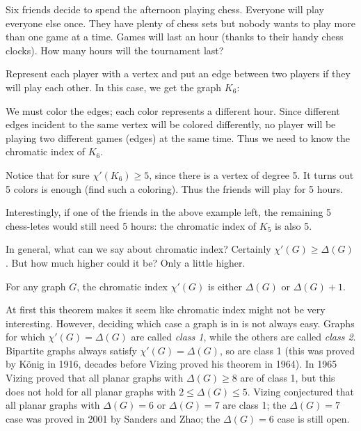 \documentclass[12pt]{article}
\begin{document}
\begin{example}
Six friends decide to spend the afternoon playing chess.  Everyone will play everyone else once.  They have plenty of chess sets but nobody wants to play more than one game at a time.  Games will last an hour (thanks to their handy chess clocks).  How many hours will the tournament last?

\begin{solution}
Represent each player with a vertex and put an edge between two players if they will play each other.  In this case, we get the graph $K_6$:

\begin{center}
\end{center}

We must color the edges; each color represents a different hour.  Since different edges incident to the same vertex will be colored differently, no player will be playing two different games (edges) at the same time.  Thus we need to know the chromatic index of $K_6$.

Notice that for sure $\chi'(K_6) \ge 5$, since there is a vertex of degree 5. It turns out 5 colors is enough (find such a coloring).  Thus the friends will play for 5 hours.
\end{solution}
\end{example}

Interestingly, if one of the friends in the above example left, the remaining 5 chess-letes would still need 5 hours: the chromatic index of $K_5$ is also 5.

In general, what can we say about chromatic index?  Certainly $\chi'(G) \ge \Delta(G)$.  But how much higher could it be?  Only a little higher.

\begin{theorem}
For any graph $G$, the chromatic index $\chi'(G)$ is either $\Delta(G)$ or $\Delta(G) + 1$.
\end{theorem}

At first this theorem makes it seem like chromatic index might not be very interesting.  However, deciding which case a graph is in is not always easy.  Graphs for which $\chi'(G) = \Delta(G)$ are called \emph{class 1}, while the others are called \emph{class 2}. Bipartite graphs always satisfy $\chi'(G) = \Delta(G)$, so are class 1 (this was proved by K\"onig in 1916, decades before Vizing proved his theorem in 1964).  In 1965 Vizing proved that all planar graphs with $\Delta(G) \ge 8$ are of class 1, but this does not hold for all planar graphs with $2 \le \Delta(G) \le 5$.  Vizing conjectured that all planar graphs with $\Delta(G) = 6$ or $\Delta(G) = 7$ are class 1; the $\Delta(G) = 7$ case was proved in 2001 by Sanders and Zhao; the $\Delta(G) = 6$ case is still open.
\end{document}
